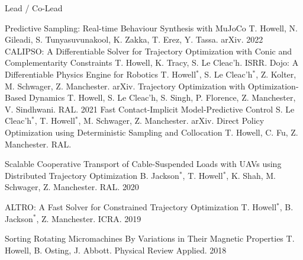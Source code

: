 

\begin{center} \small{Lead / Co-Lead} \end{center}
\begin{cvhonors}

	\cvhonor
	{Predictive Sampling: Real-time Behaviour Synthesis with MuJoCo} %
	{T. Howell, N. Gileadi, S. Tunyasuvunakool, K. Zakka, T. Erez, Y. Tassa. arXiv.} %
	{}
	{2022} %
	\cvhonor
	{CALIPSO: A Differentiable Solver for Trajectory Optimization with Conic and Complementarity Constraints} %
	{T. Howell, K. Tracy, S. Le Cleac'h. ISRR.} %
	{}
	{} %
	\cvhonor
	{Dojo: A Differentiable Physics Engine for Robotics} %
	{T. Howell$^*$, S. Le Cleac'h$^*$, Z. Kolter, M. Schwager, Z. Manchester. arXiv.} %
	{}
	{} %
   \cvhonor
	{Trajectory Optimization with Optimization-Based Dynamics} %
	{T. Howell, S. Le Cleac'h, S. Singh, P. Florence, Z. Manchester, V. Sindhwani. RAL.} %
	{}
	{2021} %
   \cvhonor
	{Fast Contact-Implicit Model-Predictive Control} %
	{S. Le Cleac'h$^*$, T. Howell$^*$, M. Schwager, Z. Manchester. arXiv.} %
	{}
	{} %
  \cvhonor
    {Direct Policy Optimization using Deterministic Sampling and Collocation} %
    {T. Howell, C. Fu, Z. Manchester. RAL.} %
    {}
    {} %
    
  \cvhonor
    {Scalable Cooperative Transport of Cable-Suspended Loads with UAVs using Distributed Trajectory Optimization} %
    {B. Jackson$^*$, T. Howell$^*$, K. Shah, M. Schwager, Z. Manchester. RAL.} %
    {}
    {2020} %
    
  \cvhonor
    {ALTRO: A Fast Solver for Constrained Trajectory Optimization}
    {T. Howell$^*$, B. Jackson$^*$, Z. Manchester. ICRA.}
    {}
    {2019}
    
  \cvhonor
    {Sorting Rotating Micromachines By Variations in Their Magnetic Properties}
    {T. Howell, B. Osting, J. Abbott. Physical Review Applied.} 
    {}
    {2018}
    
\end{cvhonors}

